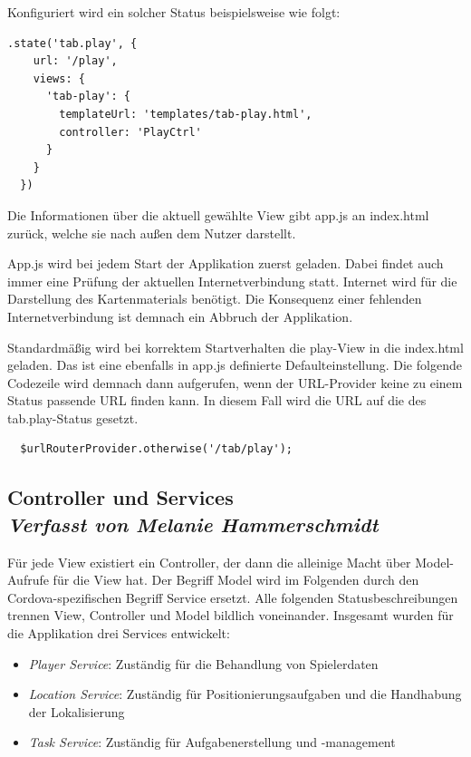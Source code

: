 \newpage
Konfiguriert wird ein solcher Status beispielsweise wie folgt:
\begin{lstlisting}
.state('tab.play', {
    url: '/play',
    views: {
      'tab-play': {
        templateUrl: 'templates/tab-play.html',
        controller: 'PlayCtrl'
      }
    }
  })
\end{lstlisting}

Die Informationen über die aktuell gewählte View gibt app.js an index.html zurück, welche sie nach außen dem Nutzer darstellt.


App.js wird bei jedem Start der Applikation zuerst geladen. Dabei findet auch immer eine Prüfung der aktuellen Internetverbindung statt. Internet wird für die Darstellung des Kartenmaterials benötigt. Die Konsequenz einer fehlenden Internetverbindung ist demnach ein Abbruch der Applikation.

Standardmäßig wird bei korrektem Startverhalten die play-View in die index.html geladen. Das ist eine ebenfalls in app.js definierte Defaulteinstellung. Die folgende Codezeile wird demnach dann aufgerufen, wenn der URL-Provider keine zu einem Status passende URL finden kann. In diesem Fall wird die URL auf die des tab.play-Status gesetzt.
\begin{lstlisting}
  $urlRouterProvider.otherwise('/tab/play');
\end{lstlisting}

\subsection[Controller und Services]{Controller und Services
 \\ \textnormal{\small{\textit {Verfasst von Melanie Hammerschmidt}}}}

Für jede View existiert ein Controller, der dann die alleinige Macht über Model-Aufrufe für die View hat. Der Begriff Model wird im Folgenden durch den Cordova-spezifischen Begriff Service ersetzt. Alle folgenden Statusbeschreibungen trennen View, Controller und Model bildlich voneinander. Insgesamt wurden für die Applikation drei Services entwickelt:
\begin{itemize}
\item \emph{Player Service}: Zuständig für die Behandlung von Spielerdaten
\item \emph{Location Service}: Zuständig für Positionierungsaufgaben und die Handhabung der Lokalisierung
\item \emph{Task Service}: Zuständig für Aufgabenerstellung und -management
\end{itemize}
